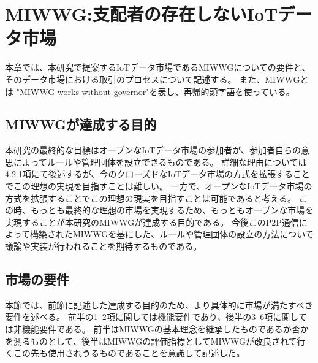 \chapter{MIWWG:支配者の存在しないIoTデータ市場}
本章では、本研究で提案するIoTデータ市場であるMIWWGについての要件と、そのデータ市場における取引のプロセスについて記述する。
また、MIWWGとは "MIWWG works without governor"を表し、再帰的頭字語を使っている。

\section{MIWWGが達成する目的}
本研究の最終的な目標はオープンなIoTデータ市場の参加者が、参加者自らの意思によってルールや管理団体を設立できるものである。
詳細な理由については4.2.1項にて後述するが、今のクローズドなIoTデータ市場の方式を拡張することでこの理想の実現を目指すことは難しい。
一方で、オープンなIoTデータ市場の方式を拡張することでこの理想の現実を目指すことは可能であると考える。
この時、もっとも最終的な理想の市場を実現するため、もっともオープンな市場を実現することが本研究のMIWWGが達成する目的である。
今後このP2P通信によって構築されたMIWWGを基にした、ルールや管理団体の設立の方法について議論や実装が行われることを期待するものである。

\section{市場の要件}
本節では、前節に記述した達成する目的のため、より具体的に市場が満たすべき要件を述べる。
前半の1~2項に関しては機能要件であり、後半の3~6項に関しては非機能要件である。
前半はMIWWGの基本理念を継承したものであるか否かを測るものとして、後半はMIWWGの評価指標としてMIWWGが改良されて行くこの先も使用されうるものであることを意識して記述した。

